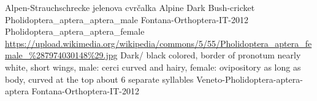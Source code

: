{Alpen-Strauchschrecke} %
{jelenova cvr\v{c}alka} %
{Alpine Dark Bush-cricket} %
{Pholidoptera_aptera_aptera_male} %
{Fontana-Orthoptera-IT-2012}%
{Pholidoptera_aptera_aptera_female} %
{\url{https://upload.wikimedia.org/wikipedia/commons/5/55/Pholidoptera_aptera_female_\%287974030148\%29.jpg}} %
{Dark/ black colored, border of pronotum nearly white, short wings, male: cerci curved and hairy, female: ovipository as long as body, curved at the top} %
{about 6 separate syllables} %
{Veneto-Pholidoptera-aptera-aptera} %
{Fontana-Orthoptera-IT-2012}%
